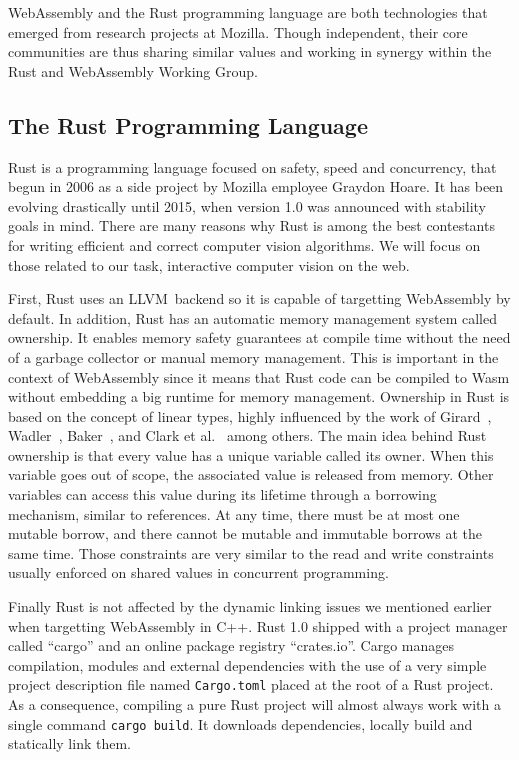 WebAssembly and the Rust programming language are both technologies
that emerged from research projects at Mozilla.
Though independent, their core communities are thus sharing similar values
and working in synergy within the Rust and WebAssembly Working Group.

\subsection{The Rust Programming Language}%
\label{sub:rust_language}

Rust is a programming language focused on safety, speed and concurrency,
that begun in 2006 as a side project by Mozilla employee Graydon Hoare.
It has been evolving drastically until 2015, when version 1.0 was announced
with stability goals in mind.
There are many reasons why Rust is among the best contestants
for writing efficient and correct computer vision algorithms.
We will focus on those related to our task,
interactive computer vision on the web.

First, Rust uses an LLVM backend so it is capable of targetting WebAssembly by default.
In addition, Rust has an automatic memory management system called ownership.
It enables memory safety guarantees at compile time
without the need of a garbage collector or manual memory management.
This is important in the context of WebAssembly since it means that Rust code
can be compiled to Wasm without embedding a big runtime for memory management.
Ownership in Rust is based on the concept of linear types,
highly influenced by the work of Girard~\cite{girard1987linear},
Wadler~\cite{wadler1991there}, Baker~\cite{baker1992lively},
and Clark et al.~\cite{clarke1998ownership} among others.
The main idea behind Rust ownership is that every value has
a unique variable called its owner.
When this variable goes out of scope, the associated value is released from memory.
Other variables can access this value during its lifetime
through a borrowing mechanism, similar to references.
At any time, there must be at most one mutable borrow,
and there cannot be mutable and immutable borrows at the same time.
Those constraints are very similar to the read and write constraints
usually enforced on shared values in concurrent programming.

Finally Rust is not affected by the dynamic linking issues
we mentioned earlier when targetting WebAssembly in C++.
Rust 1.0 shipped with a project manager called ``cargo''
and an online package registry ``crates.io''.
Cargo manages compilation, modules and external dependencies
with the use of a very simple project description file named \verb|Cargo.toml|
placed at the root of a Rust project.
As a consequence, compiling a pure Rust project will almost always work
with a single command \verb|cargo build|.
It downloads dependencies, locally build and statically link them.

